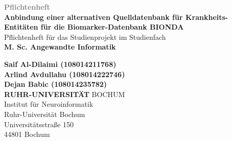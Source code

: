 \begin{titlepage}
  \thispagestyle{titlepage}
  \begin{center}
    \vspace*{4cm}
    {\Huge \textbf{ \textcolor{Gray}{Pflichtenheft}}}
    \\
    \vspace*{1cm}
    {\Large \textbf{ \textcolor{rubblue}{Anbindung einer alternativen Quelldatenbank für Krankheits-Entitäten für die Biomarker-Datenbank BIONDA}}}
    \\
    \vspace*{2cm}
    Pflichtenheft für das Studienprojekt im Studienfach\\
    \textbf{M. Sc. Angewandte Informatik}
  \end{center}
  \vfill
  \begin{flushright}
    \textbf{Saif Al-Dilaimi (108014211768)} \\
    \textbf{Arlind Avdullahu (108014222746)} \\
    \textbf{Dejan Babic (108014235782)} \\
    \textcolor{rubblue}{\textbf{RUHR-UNIVERSITÄT} BOCHUM} \\
    Institut für Neuroinformatik \\
    Ruhr-Universität Bochum \\
    Universitätsstraße 150 \\
    44801 Bochum
  \end{flushright}
\end{titlepage}
